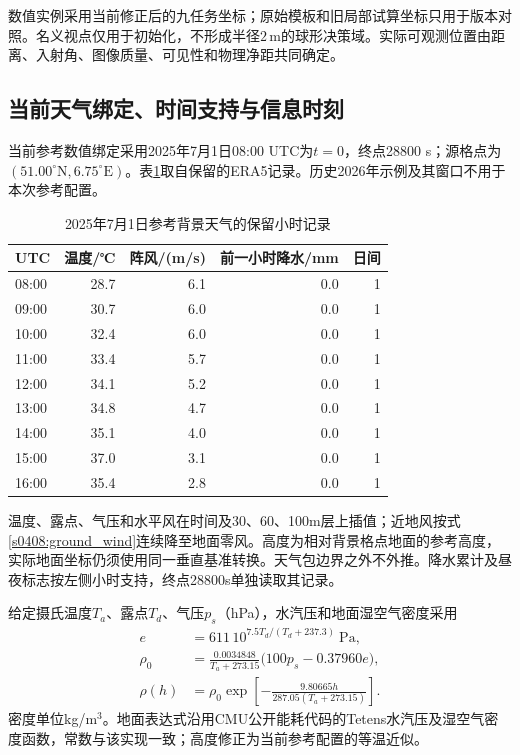 数值实例采用当前修正后的九任务坐标；原始模板和旧局部试算坐标只用于版本对照。名义视点仅用于初始化，不形成半径$2\,\mathrm m$的球形决策域。实际可观测位置由距离、入射角、图像质量、可见性和物理净距共同确定。

\subsection{当前天气绑定、时间支持与信息时刻}

当前参考数值绑定采用2025年7月1日08:00 UTC为$t=0$，终点28800 s；源格点为$(51.00^\circ\mathrm N,6.75^\circ\mathrm E)$。表\ref{s0601:weather_hourly}取自保留的ERA5记录。历史2026年示例及其窗口不用于本次参考配置。

\begin{table}[!ht]\centering
\caption{2025年7月1日参考背景天气的保留小时记录}\label{s0601:weather_hourly}
\begin{tabular}{lrrrr}\toprule
UTC & 温度/℃ & 阵风/(m/s) & 前一小时降水/mm & 日间\\\midrule
08:00 & 28.7 & 6.1 & 0.0 & 1\\
09:00 & 30.7 & 6.0 & 0.0 & 1\\
10:00 & 32.4 & 6.0 & 0.0 & 1\\
11:00 & 33.4 & 5.7 & 0.0 & 1\\
12:00 & 34.1 & 5.2 & 0.0 & 1\\
13:00 & 34.8 & 4.7 & 0.0 & 1\\
14:00 & 35.1 & 4.0 & 0.0 & 1\\
15:00 & 37.0 & 3.1 & 0.0 & 1\\
16:00 & 35.4 & 2.8 & 0.0 & 1\\
\bottomrule\end{tabular}\end{table}

温度、露点、气压和水平风在时间及30、60、100m层上插值；近地风按式\eqref{s0408:ground_wind}连续降至地面零风。高度为相对背景格点地面的参考高度，实际地面坐标仍须使用同一垂直基准转换。天气包边界之外不外推。降水累计及昼夜标志按左侧小时支持，终点28800s单独读取其记录。

给定摄氏温度$T_a$、露点$T_d$、气压$p_s$（hPa），水汽压和地面湿空气密度采用
\begin{align}
 e&=611\,10^{7.5T_d/(T_d+237.3)}\ \mathrm{Pa},\\
 \rho_0&=\frac{0.0034848}{T_a+273.15}\bigl(100p_s-0.37960e\bigr),\\
 \rho(h)&=\rho_0\exp\left[-\frac{9.80665h}{287.05(T_a+273.15)}\right].
 \label{s0601:reference_density}
\end{align}
密度单位kg/m$^3$。地面表达式沿用CMU公开能耗代码的Tetens水汽压及湿空气密度函数\cite{Choudhry2021}，常数与该实现一致；高度修正为当前参考配置的等温近似。

